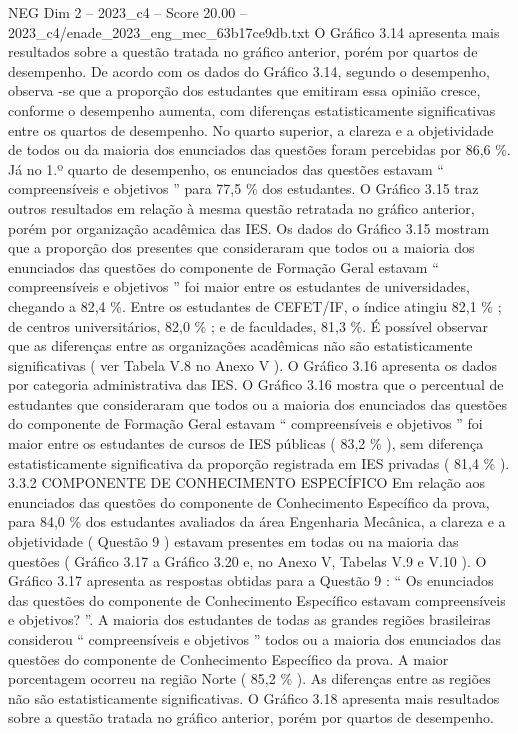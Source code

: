 \begin{textsample}{NEG Dim 2 – 2023\_c4 – Score 20.00 – 2023\_c4/enade\_2023\_eng\_mec\_63b17ce9db.txt}
O Gráfico 3.14 apresenta mais resultados sobre a questão tratada no gráfico anterior, porém por quartos de desempenho.
De acordo com os dados do Gráfico 3.14, segundo o desempenho, observa -se que a proporção dos estudantes que emitiram essa opinião cresce, conforme o desempenho aumenta, com diferenças estatisticamente significativas entre os quartos de desempenho.
No quarto superior, a clareza e a objetividade de todos ou da maioria dos enunciados das questões foram percebidas por 86,6 \%.
Já no 1.º quarto de desempenho, os enunciados das questões estavam “ compreensíveis e objetivos ” para 77,5 \% dos estudantes.
O Gráfico 3.15 traz outros resultados em relação à mesma questão retratada no gráfico anterior, porém por organização acadêmica das IES.
Os dados do Gráfico 3.15 mostram que a proporção dos presentes que consideraram que todos ou a maioria dos enunciados das questões do componente de Formação Geral estavam “ compreensíveis e objetivos ” foi maior entre os estudantes de universidades, chegando a 82,4 \%.
Entre os estudantes de CEFET/IF, o índice atingiu 82,1 \% ; de centros universitários, 82,0 \% ; e de faculdades, 81,3 \%.
É possível observar que as diferenças entre as organizações acadêmicas não são estatisticamente significativas ( ver Tabela V.8 no Anexo V ).
O Gráfico 3.16 apresenta os dados por categoria administrativa das IES.
O Gráfico 3.16 mostra que o percentual de estudantes que consideraram que todos ou a maioria dos enunciados das questões do componente de Formação Geral estavam “ compreensíveis e objetivos ” foi maior entre os estudantes de cursos de IES públicas ( 83,2 \% ), sem diferença estatisticamente significativa da proporção registrada em IES privadas ( 81,4 \% ). 3.3.2 COMPONENTE DE CONHECIMENTO ESPECÍFICO Em relação aos enunciados das questões do componente de Conhecimento Específico da prova, para 84,0 \% dos estudantes avaliados da área Engenharia Mecânica, a clareza e a objetividade ( Questão 9 ) estavam presentes em todas ou na maioria das questões ( Gráfico 3.17 a Gráfico 3.20 e, no Anexo V, Tabelas V.9 e V.10 ).
O Gráfico 3.17 apresenta as respostas obtidas para a Questão 9 : “ Os enunciados das questões do componente de Conhecimento Específico estavam compreensíveis e objetivos? ”.
A maioria dos estudantes de todas as grandes regiões brasileiras considerou “ compreensíveis e objetivos ” todos ou a maioria dos enunciados das questões do componente de Conhecimento Específico da prova.
A maior porcentagem ocorreu na região Norte ( 85,2 \% ).
As diferenças entre as regiões não são estatisticamente significativas.
O Gráfico 3.18 apresenta mais resultados sobre a questão tratada no gráfico anterior, porém por quartos de desempenho.

\end{textsample}
